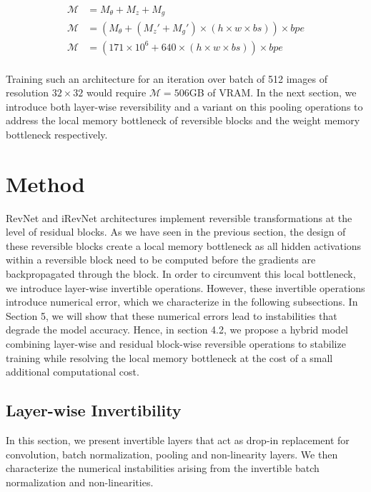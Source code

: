 \documentclass[twocolumn]{bmcart}
\begin{document}
\begin{subequations}
\begin{align}
\mathcal{M} &= M_{\theta} + M_{z} + M_{g} \\
\mathcal{M} &= (M_{\theta} + (M_z' + M_{g}') \times (h \times w \times bs)) \times bpe \\
\mathcal{M} &= (171 \times 10^6 + 640 \times (h \times w \times bs)) \times bpe \\
\end{align}
\end{subequations}

Training such an architecture for an iteration over batch of 512 images of resolution $32 \times 32$ would require $\mathcal{M}=506$GB of VRAM.
In the next section, we introduce both layer-wise reversibility and a variant on this pooling operations to address the local memory bottleneck 
of reversible blocks and the weight memory bottleneck respectively.

\section{Method}

RevNet and iRevNet architectures implement reversible transformations at the level of residual blocks. 
As we have seen in the previous section, the design of these reversible blocks create a local memory bottleneck as all hidden activations within a reversible block need to be computed before the gradients are backpropagated through the block.
In order to circumvent this local bottleneck, we introduce layer-wise invertible operations. 
However, these invertible operations introduce numerical error, which we characterize in the following subsections.
In Section 5, we will show that these numerical errors lead to instabilities that degrade the model accuracy.
Hence, in section 4.2, we propose a hybrid model combining layer-wise and residual block-wise reversible operations to stabilize training while resolving the local memory bottleneck at the cost of a small additional computational cost.

\subsection{Layer-wise Invertibility}

In this section, we present invertible layers that act as drop-in replacement for convolution, batch normalization, pooling and non-linearity layers. We then characterize the numerical instabilities arising from the invertible batch normalization and non-linearities.
\end{document}
